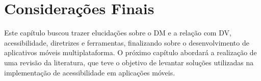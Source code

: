\section{Considerações Finais}

Este capítulo buscou trazer elucidações sobre o DM e a relação com DV, acessibilidade, diretrizes e ferramentas,
finalizando sobre o desenvolvimento de aplicativos móveis multiplataforma.
O próximo capítulo abordará a realização de uma revisão da literatura, que teve o objetivo de levantar soluções
utilizadas na implementação de acessibilidade em aplicações móveis.